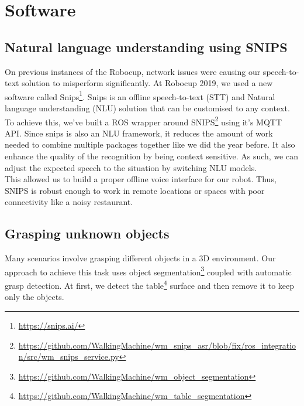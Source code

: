 \documentclass[runningheads,a4paper]{llncs}
\begin{document}
\newpage
\section{Software}

\subsection{Natural language understanding using SNIPS}

\tab On previous instances of the Robocup, network issues were causing our speech-to-text solution to misperform significantly. At Robocup 2019, we used a new software called Snips\footnote{\url{https://snips.ai/}}. Snips is an offline speech-to-text (STT) and Natural language understanding (NLU) solution that can be customised to any context. To achieve this, we’ve built a ROS wrapper around SNIPS\footnote{\url{https://github.com/WalkingMachine/wm_snips_asr/blob/fix/ros_integration/src/wm_snips_service.py}} using it’s MQTT API. Since snips is also an NLU framework, it reduces the amount of work needed to combine multiple packages together like we did the year before. It also enhance the quality of the recognition by being context sensitive. As such, we can adjust the expected speech to the situation by switching NLU models.\\

This allowed us to build a proper offline voice interface for our robot. Thus, SNIPS is robust enough to work in remote locations or spaces with poor connectivity like a noisy restaurant. 

\newpage
\subsection{Grasping unknown objects}
\tab Many scenarios involve grasping different objects in a 3D environment. Our approach to achieve this task uses object segmentation\footnote{\url{https://github.com/WalkingMachine/wm_object_segmentation}} coupled with automatic grasp detection.
At first, we detect the table\footnote{\url{https://github.com/WalkingMachine/wm_table_segmentation}} surface and then remove it to keep only the objects.
\end{document}
